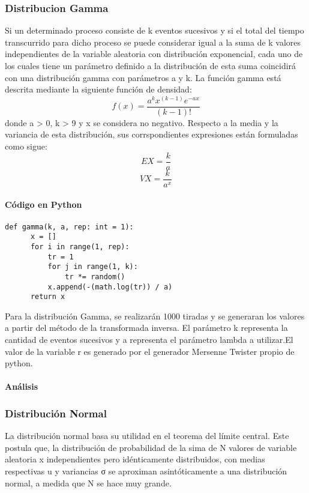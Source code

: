 \documentclass{article}
\begin{document}
  \subsubsection{Distribucion Gamma}
  Si un determinado proceso consiste de k eventos sucesivos y si el total del tiempo transcurrido para dicho proceso se puede considerar igual a la suma de k valores independientes de la variable aleatoria con distribución
  exponencial, cada uno de los cuales tiene un parámetro definido a la distribución de esta suma coincidirá con una distribución gamma con parámetros a y k.
  La función gamma está descrita mediante la siguiente función de densidad:
  \begin{equation}
    f(x) = \frac{a^{k}x^{(k-1)}e^{-ax}}{(k-1)!}
  \end{equation}
  donde a > 0, k > 9 y x se considera no negativo.
  Respecto a la media y la variancia de esta distribución, sus corrspondientes expresiones están formuladas como sigue:
  \begin{equation}
    EX = \frac{k}{a}
  \end{equation}
  \begin{equation}
    VX = \frac{k}{a^{x}}
  \end{equation}

  \paragraph{Código en Python}
  \begin{lstlisting}[style = Python]
   def gamma(k, a, rep: int = 1):
      x = []
      for i in range(1, rep):
          tr = 1
          for j in range(1, k):
              tr *= random()
          x.append(-(math.log(tr)) / a)
      return x
  \end{lstlisting}
  Para la distribución Gamma, se realizarán 1000 tiradas y se generaran los valores a partir del método de la transformada
  inversa. El parámetro k representa la cantidad de eventos sucesivos y a representa el parámetro lambda a utilizar.El valor
  de la variable r es generado por el generador Mersenne Twister propio de python.

  \paragraph{Análisis}


  \subsubsection{Distribución Normal}
  La distribución normal basa su utilidad en el teorema del límite central. Este postula que, la distribución de probabilidad de la sima de N valores
  de variable aleatoria x independientes pero idénticamente distribuidos, con medias respectivas u y variancias σ se aproximan asintóticamente a una distribución normal, a medida
  que N se hace muy grande.
\end{document}
